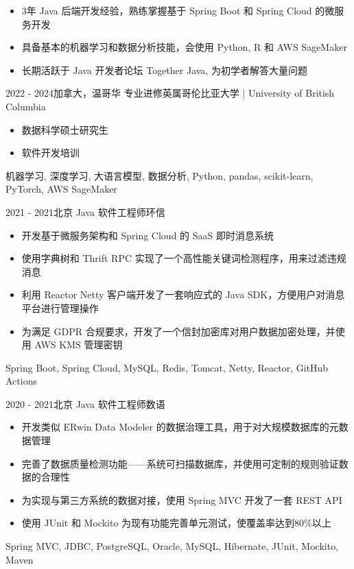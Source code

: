 \documentclass[alternative]{resume_template}
\begin{document}
	\makecvheader

    \begin{itemize}
        \item 3年 Java 后端开发经验，熟练掌握基于 Spring Boot 和 Spring Cloud 的微服务开发 
        \item 具备基本的机器学习和数据分析技能，会使用 Python, R 和 AWS SageMaker 
        \item 长期活跃于 Java 开发者论坛 Together Java, 为初学者解答大量问题
    \end{itemize}

    \begin{experiences}
    
    \experience
    {2022 - 2024}{加拿大，温哥华}
    {专业进修}{英属哥伦比亚大学 | University of British Columbia}
    {
        \begin{itemize}
        \item 数据科学硕士研究生
        \item 软件开发培训
        \end{itemize}
    }
    {机器学习, 深度学习, 大语言模型, 数据分析, Python, pandas, scikit-learn, PyTorch, AWS SageMaker}
    
    \experience
    {2021 - 2021}{北京}
    {Java 软件工程师}{环信}
    {
        \begin{itemize}
        \item 开发基于微服务架构和 Spring Cloud 的 SaaS 即时消息系统
        \item 使用字典树和 Thrift RPC 实现了一个高性能关键词检测程序，用来过滤违规消息
        \item 利用 Reactor Netty 客户端开发了一套响应式的 Java SDK，方便用户对消息平台进行管理操作
        \item 为满足 GDPR 合规要求，开发了一个信封加密库对用户数据加密处理，并使用 AWS KMS 管理密钥
        \end{itemize}
    }
    {Spring Boot, Spring Cloud, MySQL, Redis, Tomcat, Netty, Reactor, GitHub Actions}
    
    \experience
    {2020 - 2021}{北京}
    {Java 软件工程师}{数语}
    {
        \begin{itemize}
        \item 开发类似 ERwin Data Modeler 的数据治理工具，用于对大规模数据库的元数据管理
        \item 完善了数据质量检测功能——系统可扫描数据库，并使用可定制的规则验证数据的合理性
        \item 为实现与第三方系统的数据对接，使用 Spring MVC 开发了一套 REST API
        \item 使用 JUnit 和 Mockito 为现有功能完善单元测试，使覆盖率达到80\%以上
        \end{itemize}
    }
    {Spring MVC, JDBC, PostgreSQL, Oracle, MySQL, Hibernate, JUnit, Mockito, Maven}
    

\end{experiences}
\end{document}
